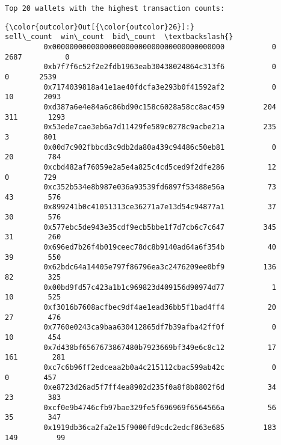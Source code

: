 \documentclass[11pt]{article}
\begin{document}
    \begin{Verbatim}[commandchars=\\\{\}]
Top 20 wallets with the highest transaction counts:

    \end{Verbatim}

\begin{Verbatim}[commandchars=\\\{\}]
{\color{outcolor}Out[{\color{outcolor}26}]:}                                             sell\_count  win\_count  bid\_count  \textbackslash{}
         0x0000000000000000000000000000000000000000           0       2687          0   
         0xb7f7f6c52f2e2fdb1963eab30438024864c313f6           0          0       2539   
         0x7174039818a41e1ae40fdcfa3e293b0f41592af2           0         10       2093   
         0xd387a6e4e84a6c86bd90c158c6028a58cc8ac459         204        311       1293   
         0x53ede7cae3eb6a7d11429fe589c0278c9acbe21a         235          3        801   
         0x00d7c902fbbcd3c9db2da80a439c94486c50eb81           0         20        784   
         0xcbd482af76059e2a5e4a825c4cd5ced9f2dfe286          12          0        729   
         0xc352b534e8b987e036a93539fd6897f53488e56a          73         43        576   
         0x899241b0c41051313ce36271a7e13d54c94877a1          37         30        576   
         0x577ebc5de943e35cdf9ecb5bbe1f7d7cb6c7c647         345         31        260   
         0x696ed7b26f4b019ceec78dc8b9140ad64a6f354b          40         39        550   
         0x62bdc64a14405e797f86796ea3c2476209ee0bf9         136         82        325   
         0x00bd9fd57c423a1b1c969823d409156d90974d77           1         10        525   
         0xf3016b7608acfbec9df4ae1ead36bb5f1bad4ff4          20         27        476   
         0x7760e0243ca9baa630412865df7b39afba42ff0f           0         10        454   
         0x7d438bf6567673867480b7923669bf349e6c8c12          17        161        281   
         0xc7c6b96ff2edceaa2b0a4c215112cbac599ab42c           0          0        457   
         0xe8723d26ad5f7ff4ea8902d235f0a8f8b8802f6d          34         23        383   
         0xcf0e9b4746cfb97bae329fe5f696969f6564566a          56         35        347   
         0x1919db36ca2fa2e15f9000fd9cdc2edcf863e685         183        149         99   
         

\end{Verbatim}
\end{document}
